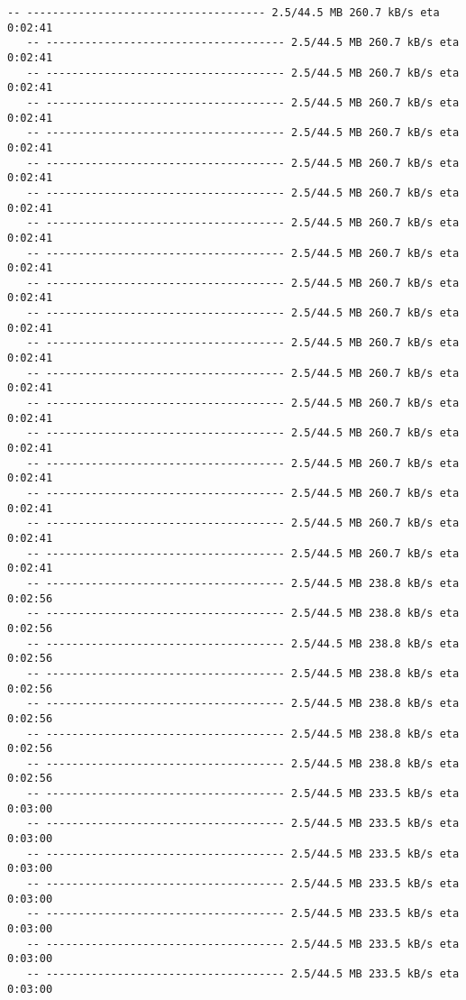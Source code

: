 \documentclass[11pt]{article}
\begin{document}
\begin{Verbatim}[commandchars=\\\{\}]
   -- ------------------------------------- 2.5/44.5 MB 260.7 kB/s eta 0:02:41
   -- ------------------------------------- 2.5/44.5 MB 260.7 kB/s eta 0:02:41
   -- ------------------------------------- 2.5/44.5 MB 260.7 kB/s eta 0:02:41
   -- ------------------------------------- 2.5/44.5 MB 260.7 kB/s eta 0:02:41
   -- ------------------------------------- 2.5/44.5 MB 260.7 kB/s eta 0:02:41
   -- ------------------------------------- 2.5/44.5 MB 260.7 kB/s eta 0:02:41
   -- ------------------------------------- 2.5/44.5 MB 260.7 kB/s eta 0:02:41
   -- ------------------------------------- 2.5/44.5 MB 260.7 kB/s eta 0:02:41
   -- ------------------------------------- 2.5/44.5 MB 260.7 kB/s eta 0:02:41
   -- ------------------------------------- 2.5/44.5 MB 260.7 kB/s eta 0:02:41
   -- ------------------------------------- 2.5/44.5 MB 260.7 kB/s eta 0:02:41
   -- ------------------------------------- 2.5/44.5 MB 260.7 kB/s eta 0:02:41
   -- ------------------------------------- 2.5/44.5 MB 260.7 kB/s eta 0:02:41
   -- ------------------------------------- 2.5/44.5 MB 260.7 kB/s eta 0:02:41
   -- ------------------------------------- 2.5/44.5 MB 260.7 kB/s eta 0:02:41
   -- ------------------------------------- 2.5/44.5 MB 260.7 kB/s eta 0:02:41
   -- ------------------------------------- 2.5/44.5 MB 260.7 kB/s eta 0:02:41
   -- ------------------------------------- 2.5/44.5 MB 260.7 kB/s eta 0:02:41
   -- ------------------------------------- 2.5/44.5 MB 260.7 kB/s eta 0:02:41
   -- ------------------------------------- 2.5/44.5 MB 238.8 kB/s eta 0:02:56
   -- ------------------------------------- 2.5/44.5 MB 238.8 kB/s eta 0:02:56
   -- ------------------------------------- 2.5/44.5 MB 238.8 kB/s eta 0:02:56
   -- ------------------------------------- 2.5/44.5 MB 238.8 kB/s eta 0:02:56
   -- ------------------------------------- 2.5/44.5 MB 238.8 kB/s eta 0:02:56
   -- ------------------------------------- 2.5/44.5 MB 238.8 kB/s eta 0:02:56
   -- ------------------------------------- 2.5/44.5 MB 238.8 kB/s eta 0:02:56
   -- ------------------------------------- 2.5/44.5 MB 233.5 kB/s eta 0:03:00
   -- ------------------------------------- 2.5/44.5 MB 233.5 kB/s eta 0:03:00
   -- ------------------------------------- 2.5/44.5 MB 233.5 kB/s eta 0:03:00
   -- ------------------------------------- 2.5/44.5 MB 233.5 kB/s eta 0:03:00
   -- ------------------------------------- 2.5/44.5 MB 233.5 kB/s eta 0:03:00
   -- ------------------------------------- 2.5/44.5 MB 233.5 kB/s eta 0:03:00
   -- ------------------------------------- 2.5/44.5 MB 233.5 kB/s eta 0:03:00

\end{Verbatim}
\end{document}

